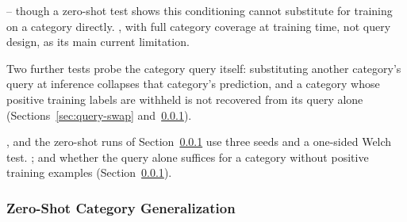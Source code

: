 
-- though a zero-shot test shows this conditioning
cannot substitute for training on a category directly.
, with full category coverage at training time, not query design, as its main
current limitation.

Two further
    tests probe the category query itself: substituting another category's query at
    inference collapses that category's prediction, and a category whose positive training
    labels are withheld is not recovered from its query alone (Sections~\ref{sec:query-swap}
    and~\ref{sec:zeroshot}).

, and the zero-shot runs of
Section~\ref{sec:zeroshot} use three seeds and a one-sided Welch test.
; and whether the query alone suffices for a
category without positive training examples (Section~\ref{sec:zeroshot}).

\subsubsection{Zero-Shot Category Generalization}
\label{sec:zeroshot}

